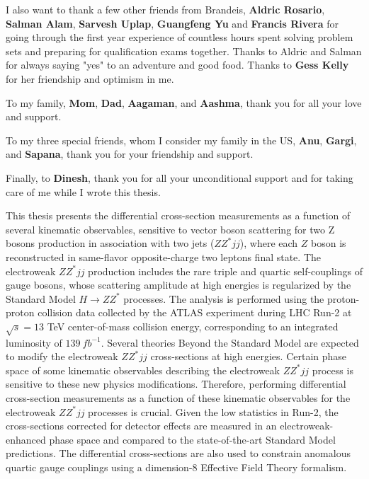 \documentclass[red]{brandeis-dissertation}
\numberwithin{equation}{section}
\begin{document}
{I also want to thank a few other friends from Brandeis, \textbf{Aldric Rosario}, \textbf{Salman Alam}, \textbf{Sarvesh Uplap}, \textbf{Guangfeng Yu} and \textbf{Francis Rivera} for going through the first year experience of countless hours spent solving problem sets and preparing for qualification exams together. Thanks to Aldric and Salman for always saying "yes" to an adventure and good food. Thanks to \textbf{Gess Kelly} for her friendship and optimism in me. 

To my family, \textbf{Mom}, \textbf{Dad}, \textbf{Aagaman}, and \textbf{Aashma}, thank you for all your love and support. 

To my three special friends, whom I consider my family in the US, \textbf{Anu}, \textbf{Gargi}, and \textbf{Sapana}, thank you for your friendship and support. 

Finally, to \textbf{Dinesh}, thank you for all your unconditional support and for taking care of me while I wrote this thesis.
}


\clearpage

\begin{dissertation-abstract}

This thesis presents the differential cross-section measurements as a function of several kinematic observables, sensitive to vector boson scattering for two Z bosons production in association with two jets ($ZZ^*jj$), where each $Z$ boson is reconstructed in same-flavor opposite-charge two leptons final state. The electroweak $ZZ^*jj$ production includes the rare triple and quartic self-couplings of gauge bosons, whose scattering amplitude at high energies is regularized by the Standard Model $H\rightarrow ZZ^{*}$ processes. The analysis is performed using the proton-proton collision data collected by the ATLAS experiment during LHC Run-2 at $\sqrt{s}=13$ TeV center-of-mass collision energy, corresponding to an integrated luminosity of $139~fb^{-1}$. Several theories Beyond the Standard Model are expected to modify the electroweak $ZZ^*jj$ cross-sections at high energies. Certain phase space of some kinematic observables describing the electroweak $ZZ^*jj$ process is sensitive to these new physics modifications. Therefore, performing differential cross-section measurements as a function of these kinematic observables for the electroweak $ZZ^*jj$ processes is crucial. Given the low statistics in Run-2, the cross-sections corrected for detector effects are measured in an electroweak-enhanced phase space and compared to the state-of-the-art Standard Model predictions. The differential cross-sections are also used to constrain anomalous quartic gauge couplings using a dimension-8 Effective Field Theory formalism. 

\end{dissertation-abstract}
\clearpage
\end{document}
